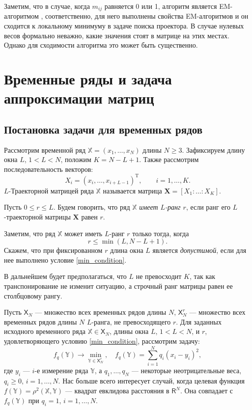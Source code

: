 \documentclass[12pt,a4paper,fleqn,leqno]{article}
\newcommand{\rmT}{\mathrm{T}}
\newcommand{\tsX}{\mathbb{X}}
\newcommand{\tsY}{\mathbb{Y}}
\newcommand{\bfX}{\mathbf{X}}
\newcommand{\sfR}{\mathsf{R}}
\newcommand{\sfX}{\mathsf{X}}
\begin{document}
Заметим, что в случае, когда $m_{ij}$ равняется 0 или 1, алгоритм является EM-алгоритмом \cite{Srebro2003},
соответственно, для него выполнены свойства EM-алгоритмов и он сходится к локальному минимуму в задаче поиска проектора.
В случае нулевых весов формально неважно, какие значения стоят в матрице на этих местах. Однако для сходимости алгоритма
это может быть существенно.

\section{Временные ряды и задача аппроксимации матриц}
\label{sec:ts_matrices}
\subsection{Постановка задачи для временных рядов}
Рассмотрим временной ряд $\tsX = (x_1, \ldots, x_N)$ длины $N \ge 3$. Зафиксируем длину окна $L$, $1 < L < N$, положим $K = N - L + 1$. Также рассмотрим последовательность векторов:
\begin{equation}\label{l_lagged}
X_i = (x_i, \ldots, x_{i + L - 1})^\rmT, \qquad i = 1, \ldots, K.
\end{equation}
$L$-Траекторной матрицей ряда $\tsX$ называется матрица $\bfX = [X_1:\ldots:X_K]$.

\begin{definition}
Пусть $0 \le r \le L$. Будем говорить, что ряд $\tsX$ \emph{имеет $L$-ранг $r$}, если ранг его $L$-траекторной матрицы $\bfX$ равен $r$.
\end{definition}

Заметим, что ряд $\tsX$ может иметь $L$-ранг $r$ только тогда, когда
\begin{equation}
r \le \min(L, N-L+1). \label{min_condition}
\end{equation}
Скажем, что при фиксированном $r$ длина окна $L$ является \emph{допустимой}, если для нее выполнено условие \eqref{min_condition}.

В дальнейшем будет предполагаться, что $L$ не превосходит $K$, так как транспонирование не изменит ситуацию, а строчный ранг матрицы равен ее столбцовому рангу.

Пусть $\sfX_N$ --- множество всех временных рядов длины $N$, $\sfX_N^r$ --- множество всех временных рядов длины $N$ $L$-ранга, не превосходящего $r$. Для заданных исходного временного ряда $\tsX \in \sfX_N$, длины окна $L$, $1 < L < N$, и $r$, удовлетворяющего условию \eqref{min_condition}, рассмотрим задачу:
\begin{equation} \label{L-rank_task}
f_q(\tsY) \to \min_{\tsY \in \sfX_N^r}, \quad f_q(\tsY) = \sum \limits_{i=1}^N q_i(x_i - y_i)^2,
\end{equation}
где $y_i$ --- $i$-е измерение ряда $\tsY$, а $q_1, \ldots, q_N$ --- некоторые неотрицательные веса,
$q_i \ge 0$, $i = 1, \ldots, N$. Нас больше всего интересует случай, когда целевая функция $f(\tsY) = \rho^2(\tsX, \tsY)$ --- квадрат евклидова расстояния в $\sfR^N$. Она совпадает с $f_q(\tsY)$ при $q_i = 1$, $i = 1, \ldots, N$.
\end{document}
